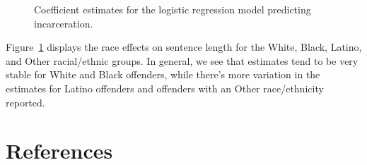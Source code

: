 \documentclass[
  letterpaper,
  DIV=11,
  numbers=noendperiod]{scrartcl}
\begin{document}
\begin{figure}
\begin{minipage}[t]{0.50\linewidth}
{\centering 


}

\end{minipage}%

\caption{\label{fig-sens-analysis-res}Coefficient estimates for the
logistic regression model predicting incarceration.}

\end{figure}

Figure~\ref{fig-sens-analysis-res} displays the race effects on sentence
length for the White, Black, Latino, and Other racial/ethnic groups. In
general, we see that estimates tend to be very stable for White and
Black offenders, while there's more variation in the estimates for
Latino offenders and offenders with an Other race/ethnicity reported.

\newpage

\hypertarget{references}{%
\section*{References}\label{references}}
\end{document}
